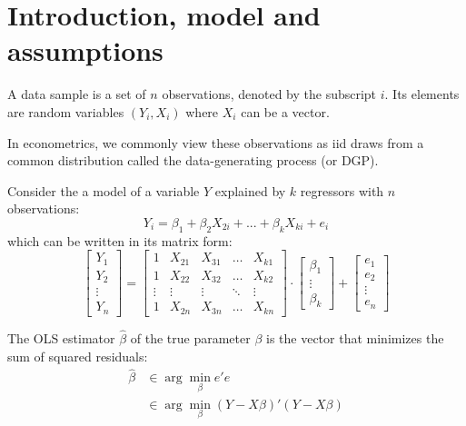 \section{Introduction, model and assumptions}

\begin{definition}
A data sample is a set of $n$ observations, denoted by the subscript $i$. Its elements are random variables $(Y_i, X_i)$ where $X_i$ can be a vector.
\end{definition}

In econometrics, we commonly view these observations as iid draws from a common distribution called the data-generating process (or DGP). 

Consider the a model of a variable $Y$ explained by $k$ regressors with $n$ observations: $$Y_i = \beta_1 + \beta_{2}X_{2i} + ... + \beta_kX_{ki} + e_i$$ which can be written in its matrix form:\[
\begin{bmatrix}
    Y_{1}\\
    Y_{2}\\
    \vdots\\
    Y_{n}
\end{bmatrix}
=
\begin{bmatrix}
    1       & X_{21} & X_{31} & \dots & X_{k1} \\
    1       & X_{22} & X_{32} & \dots & X_{k2} \\
    \vdots & \vdots & \vdots & \ddots & \vdots \\
    1       & X_{2n} & X_{3n} & \dots & X_{kn}
\end{bmatrix}
\cdot
\begin{bmatrix}
    \beta_1 \\
    \vdots \\
    \beta_k
\end{bmatrix}
+ 
\begin{bmatrix}
    e_{1}\\
    e_{2}\\
    \vdots\\
    e_{n}
\end{bmatrix}
\]
\begin{definition}
The OLS estimator $\hat\beta$ of the true parameter $\beta$ is the vector that minimizes the sum of squared residuals:\begin{align*}
\hat\beta & \in \operatorname{arg}\min_{\beta} e'e\\
& \in \operatorname{arg}\min_{\beta} (Y -  X\beta)'(Y -  X\beta)
\end{align*} 
\end{definition}

